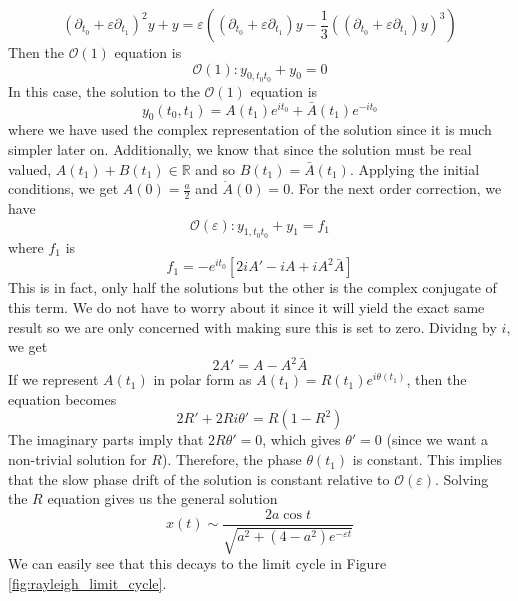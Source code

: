 \documentclass{article}
\begin{document}
\begin{equation*}
    (\partial_{t_0} + \varepsilon \partial_{t_1})^2 y + y = \varepsilon \left((\partial_{t_0} + \varepsilon \partial_{t_1}) y - \frac{1}{3} ((\partial_{t_0} + \varepsilon \partial_{t_1}) y)^3\right)
\end{equation*}
Then the $\mathcal{O}(1)$ equation is
\begin{equation*}
    \mathcal{O}(1):y_{0,t_0t_0} + y_0 = 0
\end{equation*}
In this case, the solution to the $\mathcal{O}(1)$ equation is
\begin{equation*}
    y_0(t_0,t_1) = A(t_1)e^{i t_0} + \bar A (t_1)e^{-i t_0}
\end{equation*}
where we have used the complex representation of the solution since it is much simpler later on. Additionally, we know that since the solution must be real valued, $A(t_1)+B(t_1) \in \mathbb{R}$ and so $B(t_1) = \bar A(t_1)$. Applying the initial conditions, we get $A(0) = \frac{a}{2}$ and $\dot A(0) = 0$. For the next order correction, we have 
\begin{equation*}
    \mathcal{O}(\varepsilon): y_{1,t_0t_0} + y_1 = f_1
\end{equation*}
where $f_1$ is 
\begin{equation*}
    f_1 = -e^{it_0} \left[2iA' - iA+iA^2\bar A\right]
\end{equation*}
This is in fact, only half the solutions but the other is the complex conjugate of this term. We do not have to worry about it since it will yield the exact same result so we are only concerned with making sure this is set to zero. Dividng by $i$, we get 
\begin{equation*}
    2A' = A - A^2\bar A
\end{equation*}
If we represent $A(t_1)$ in polar form as $A(t_1) =  R(t_1) e^{i\theta(t_1)}$, then the equation becomes 
\begin{equation*}
    2R' +2Ri\theta' = R (1-R^2)
\end{equation*}
The imaginary parts imply that $2R\theta' = 0$, which gives $\theta' = 0$ (since we want a non-trivial solution for $R$). Therefore, the phase $\theta(t_1)$ is constant. This implies that the slow phase drift of the solution is constant relative to $\mathcal{O}(\varepsilon)$. Solving the $R$ equation gives us the general solution 
\begin{equation*}
    x(t) \sim \frac{2a\cos t}{\sqrt{a^2 +(4-a^2)e^{-\varepsilon t}}}
\end{equation*}
We can easily see that this decays to the limit cycle in Figure \ref{fig:rayleigh_limit_cycle}.
\end{document}
